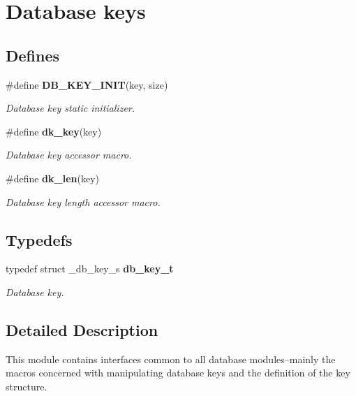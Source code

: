 \section{Database keys}
\label{group__dbprim__key}
\subsection*{Defines}
\begin{CompactItemize}
\item 
\#define {\bf DB\_\-KEY\_\-INIT}(key, size)
\begin{CompactList}\small\item\em Database key static initializer.\item\end{CompactList}\item 
\#define {\bf dk\_\-key}(key)
\begin{CompactList}\small\item\em Database key accessor macro.\item\end{CompactList}\item 
\#define {\bf dk\_\-len}(key)
\begin{CompactList}\small\item\em Database key length accessor macro.\item\end{CompactList}\end{CompactItemize}
\subsection*{Typedefs}
\begin{CompactItemize}
\item 
typedef struct \_\-db\_\-key\_\-s {\bf db\_\-key\_\-t}
\begin{CompactList}\small\item\em Database key.\item\end{CompactList}\end{CompactItemize}


\subsection{Detailed Description}
This module contains interfaces common to all database modules--mainly the macros concerned with manipulating database keys and the definition of the key structure.

